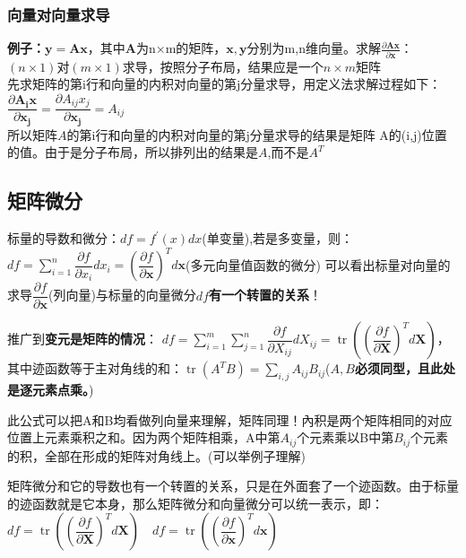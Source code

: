 \documentclass[UTF8]{article}
\begin{document}
    \subsubsection{向量对向量求导}
    \textbf{例子：}$\mathbf{y}=\mathbf{A} \mathbf{x}$，其中$\mathbf{A}$为n×m的矩阵，$\mathbf{x}, \mathbf{y}$分别为m,n维向量。求解$\frac{\partial \mathbf{A} \mathbf{x}}{\partial \mathbf{x}}$：
    \\
    $(n\times 1)$对$(m\times 1)$求导，按照分子布局，结果应是一个$n\times m$矩阵
    \\
    先求矩阵的第i行和向量的内积对向量的第j分量求导，用定义法求解过程如下：$\dfrac{\partial \mathbf{A}_{\mathbf{i}} \mathbf{x}}{\partial \mathbf{x}_{\mathbf{j}}}=\dfrac{\partial A_{i j} x_{j}}{\partial \mathbf{x}_{\mathbf{j}}}=A_{i j}$
    \\
    所以矩阵$A$的第i行和向量的内积对向量的第j分量求导的结果是矩阵 A的(i,j)位置的值。由于是分子布局，所以排列出的结果是$A$,而不是$A^T$

    \subsection{矩阵微分}
    标量的导数和微分：$d f=f^{\prime}(x) d x$(单变量),若是多变量，则：$d f=\sum_{i=1}^{n} \dfrac{\partial f}{\partial x_{i}} d x_{i}=\left(\dfrac{\partial f}{\partial \mathbf{x}}\right)^{T} d \mathbf{x}$(多元向量值函数的微分)
    可以看出标量对向量的求导$\dfrac{\partial f}{\partial \mathbf{x}}$(列向量)与标量的向量微分$d f$\textbf{有一个转置的关系}！


    推广到\textbf{变元是矩阵的情况}：
    $d f=\sum_{i=1}^{m} \sum_{j=1}^{n} \dfrac{\partial f}{\partial X_{i j}} d X_{i j}=\operatorname{tr}\left(\left(\dfrac{\partial f}{\partial \mathbf{X}}\right)^{T} d \mathbf{X}\right)$，其中迹函数等于主对角线的和：$\operatorname{tr}\left(A^{T} B\right)=\sum_{i, j} A_{i j} B_{i j}$(\textbf{$A, B$必须同型，且此处是逐元素点乘。})


    此公式可以把A和B均看做列向量来理解，矩阵同理！內积是两个矩阵相同的对应位置上元素乘积之和。因为两个矩阵相乘，A中第$A_{ij}$个元素乘以B中第$B_{ij}$个元素的积，全部在形成的矩阵对角线上。(可以举例子理解)


    矩阵微分和它的导数也有一个转置的关系，只是在外面套了一个迹函数。由于标量的迹函数就是它本身，那么矩阵微分和向量微分可以统一表示，即：$d f=\operatorname{tr}\left(\left(\dfrac{\partial f}{\partial \mathbf{X}}\right)^{T} d \mathbf{X}\right) \quad d f=\operatorname{tr}\left(\left(\dfrac{\partial f}{\partial \mathbf{x}}\right)^{T} d \mathbf{x}\right)$
\end{document}
